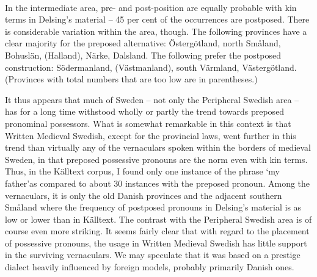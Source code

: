 
\ea
{}\\
\z
\z

In the intermediate area, pre- and post-position are equally probable with kin terms in Delsing’s material – 45 per cent of the occurrences are postposed. There is considerable variation within the area, though. The following provinces have a clear majority for the preposed alternative: Östergötland, north Småland, Bohuslän, (Halland), Närke, Dalsland. The following prefer the postposed construction: Södermanland, (Västmanland), south Värmland, Västergötland. (Provinces with total numbers that are too low are in parentheses.)


It thus appears that much of Sweden – not only the Peripheral Swedish area – has for a long time withstood wholly or partly the trend towards preposed pronominal possessors. What is somewhat remarkable in this context is that Written Medieval Swedish, except for the provincial laws, went further in this trend than virtually any of the vernaculars spoken within the borders of medieval Sweden, in that preposed possessive pronouns are the norm even with kin terms. Thus, in the Källtext corpus, I found only one instance of the phrase ‘my father’\textstyleLinguisticExample{ }as compared to about 30 instances with the preposed pronoun. Among the vernaculars, it is only the old Danish provinces and the adjacent southern Småland where the frequency of postposed pronouns in Delsing’s material is as low or lower than in Källtext. The contrast with the Peripheral Swedish area is of course even more striking. It seems fairly clear that with regard to the placement of possessive pronouns, the usage in Written Medieval Swedish has little support in the surviving vernaculars. We may speculate that it was based on a prestige dialect heavily influenced by foreign models, probably primarily Danish ones.

